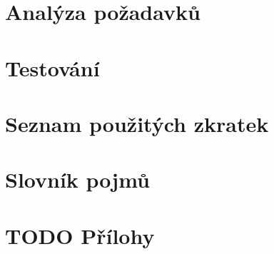 \documentclass[thesis=M,czech,hidelinks]{../template/FITthesisXE}
\begin{document}


\begin{introduction} \label{introduction}

\end{introduction}

\chapter{Analýza požadavků}


\chapter{Testování}



\nocite{*}
\printbibliography[title={Zdroje}]

\appendix

\chapter{Seznam použitých zkratek}
\printglossary[type=\acronymtype,style=acronyms]

\chapter{Slovník pojmů}
\printglossary[type=main]

\chapter{TODO Přílohy}
\end{document}
